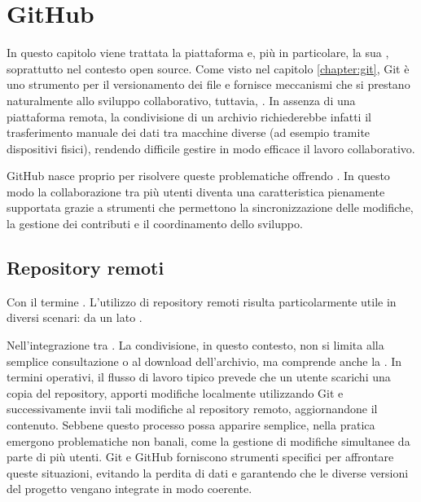 \chapter{GitHub}
\label{chapter:github}
In questo capitolo viene trattata la piattaforma  e, più in particolare, la sua , soprattutto nel contesto open source. Come visto nel capitolo \ref{chapter:git}, Git è uno strumento per il versionamento dei file e fornisce meccanismi che si prestano naturalmente allo sviluppo collaborativo, tuttavia, . In assenza di una piattaforma remota, la condivisione di un archivio richiederebbe infatti il trasferimento manuale dei dati tra macchine diverse (ad esempio tramite dispositivi fisici), rendendo difficile gestire in modo efficace il lavoro collaborativo.

GitHub nasce proprio per risolvere queste problematiche offrendo . 
In questo modo la collaborazione tra più utenti diventa una caratteristica pienamente supportata grazie a strumenti che permettono la sincronizzazione delle modifiche, la gestione dei contributi e il coordinamento dello sviluppo.


\section{Repository remoti}
\label{sec:repository-remote}
Con il termine . L'utilizzo di repository remoti risulta particolarmente utile in diversi scenari: da un lato .

Nell'integrazione tra . La condivisione, in questo contesto, non si limita alla semplice consultazione o al download dell'archivio, ma comprende anche la . In termini operativi, il flusso di lavoro tipico prevede che un utente scarichi una copia del repository, apporti modifiche localmente utilizzando Git e successivamente invii tali modifiche al repository remoto, aggiornandone il contenuto. Sebbene questo processo possa apparire semplice, nella pratica emergono problematiche non banali, come la gestione di modifiche simultanee da parte di più utenti. 
Git e GitHub forniscono strumenti specifici per affrontare queste situazioni, evitando la perdita di dati e garantendo che le diverse versioni del progetto vengano integrate in modo coerente.



